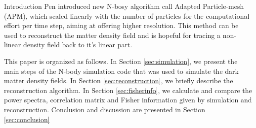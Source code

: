 \begin{section}{Introduction}
  Pen \cite{bib:Pen1995,bib:Pen1998} introduced new N-bosy algorithm call Adapted Particle-mesh (APM), which scaled linearly with the number of particles for the computational effort per time step, aiming at offering higher resolution. This method can be used to reconstruct the matter density field and is hopeful for tracing a non-linear density field back to it's linear part\cite{bib:Zhu2016}.

  This paper is organized as follows. 
  In Section \ref{sec:simulation}, we present the main steps of the N-body simulation code that was used to simulate the dark matter density fields.
  In Section \ref{sec:reconstruction}, we briefly describe the reconstruction algorithm.
  In Section \ref{sec:fisherinfo}, we calculate and compare the power spectra, correlation matrix and Fisher information given by simulation and reconstruction.
  Conclusion and discussion are presented in Section \ref{sec:conclusion}

\end{section}
